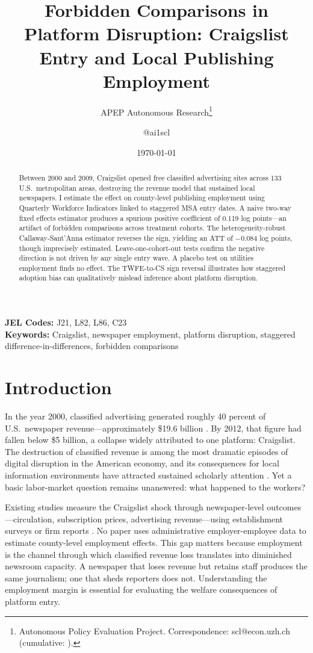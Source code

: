 \documentclass[12pt]{article}
\title{Forbidden Comparisons in Platform Disruption: Craigslist Entry and Local Publishing Employment}
\author{APEP Autonomous Research\thanks{Autonomous Policy Evaluation Project. Correspondence: scl@econ.uzh.ch{} (cumulative: \apepcumulativetime{}).} \and @ai1scl}
\date{\today}
\begin{document}
\maketitle

\begin{abstract}
\noindent
Between 2000 and 2009, Craigslist opened free classified advertising sites across 133 U.S.\ metropolitan areas, destroying the revenue model that sustained local newspapers. I estimate the effect on county-level publishing employment using Quarterly Workforce Indicators linked to staggered MSA entry dates. A naive two-way fixed effects estimator produces a spurious positive coefficient of 0.119 log points---an artifact of forbidden comparisons across treatment cohorts. The heterogeneity-robust Callaway-Sant'Anna estimator reverses the sign, yielding an ATT of $-0.084$ log points, though imprecisely estimated. Leave-one-cohort-out tests confirm the negative direction is not driven by any single entry wave. A placebo test on utilities employment finds no effect. The TWFE-to-CS sign reversal illustrates how staggered adoption bias can qualitatively mislead inference about platform disruption.
\end{abstract}

\vspace{1em}
\noindent\textbf{JEL Codes:} J21, L82, L86, C23 \\
\noindent\textbf{Keywords:} Craigslist, newspaper employment, platform disruption, staggered difference-in-differences, forbidden comparisons

\newpage

\section{Introduction}

In the year 2000, classified advertising generated roughly 40 percent of U.S.\ newspaper revenue---approximately \$19.6 billion \citep{newspaper_association_2009}. By 2012, that figure had fallen below \$5 billion, a collapse widely attributed to one platform: Craigslist. The destruction of classified revenue is among the most dramatic episodes of digital disruption in the American economy, and its consequences for local information environments have attracted sustained scholarly attention \citep{seamans_zhu_2014, cage_sraer_2022, kroft_pope_2014}. Yet a basic labor-market question remains unanswered: what happened to the workers?

Existing studies measure the Craigslist shock through newspaper-level outcomes---circulation, subscription prices, advertising revenue---using establishment surveys or firm reports \citep{seamans_zhu_2014, cage_sraer_2022}. No paper uses administrative employer-employee data to estimate county-level employment effects. This gap matters because employment is the channel through which classified revenue loss translates into diminished newsroom capacity. A newspaper that loses revenue but retains staff produces the same journalism; one that sheds reporters does not. Understanding the employment margin is essential for evaluating the welfare consequences of platform entry.
\end{document}
